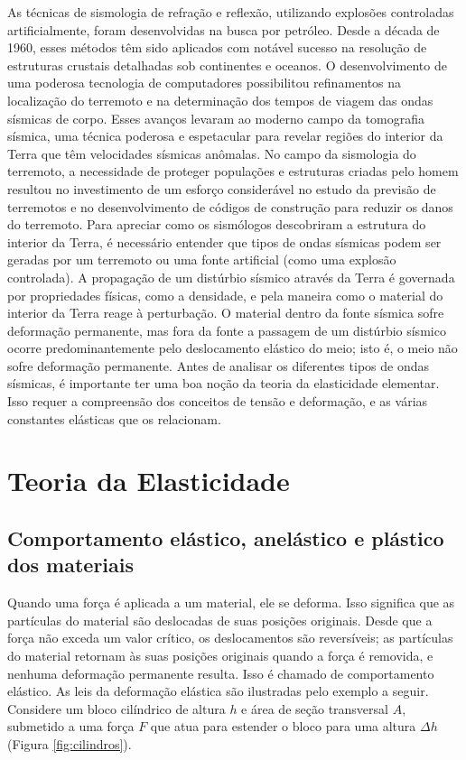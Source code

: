\documentclass[]{book}
\theoremstyle{definition}
\theoremstyle{definition}
\theoremstyle{definition}
\theoremstyle{remark}
\begin{document}
As técnicas de sismologia de refração e reflexão, utilizando explosões controladas artificialmente, foram desenvolvidas na busca por petróleo. Desde a década de 1960, esses métodos têm sido aplicados com notável sucesso na resolução de estruturas crustais detalhadas sob continentes e oceanos. O desenvolvimento de uma poderosa tecnologia de computadores possibilitou refinamentos na localização do terremoto e na determinação dos tempos de viagem das ondas sísmicas de corpo. Esses avanços levaram ao moderno campo da tomografia sísmica, uma técnica poderosa e espetacular para revelar regiões do interior da Terra que têm velocidades sísmicas anômalas. No campo da sismologia do terremoto, a necessidade de proteger populações e estruturas criadas pelo homem resultou no investimento de um esforço considerável no estudo da previsão de terremotos e no desenvolvimento de códigos de construção para reduzir os danos do terremoto.
Para apreciar como os sismólogos descobriram a estrutura do interior da Terra, é necessário entender que tipos de ondas sísmicas podem ser geradas por um terremoto ou uma fonte artificial (como uma explosão controlada). A propagação de um distúrbio sísmico
através da Terra é governada por propriedades físicas, como a densidade, e pela maneira como o material do interior da Terra reage à perturbação. O material dentro da fonte sísmica sofre deformação permanente, mas fora da fonte a passagem de um distúrbio sísmico ocorre predominantemente pelo deslocamento elástico do meio; isto é, o meio não sofre deformação permanente. Antes de analisar os diferentes tipos de ondas sísmicas, é importante ter uma boa noção da teoria da elasticidade elementar. Isso requer a compreensão dos conceitos de tensão e deformação, e as várias constantes elásticas que os relacionam.

\hypertarget{teoria-da-elasticidade}{%
\section{Teoria da Elasticidade}\label{teoria-da-elasticidade}}

\hypertarget{comportamento-elastico-anelastico-e-plastico-dos-materiais}{%
\subsection{Comportamento elástico, anelástico e plástico dos materiais}\label{comportamento-elastico-anelastico-e-plastico-dos-materiais}}

Quando uma força é aplicada a um material, ele se deforma. Isso significa que as partículas do material são deslocadas de suas posições originais. Desde que a força não exceda um valor crítico, os deslocamentos são reversíveis; as partículas do material retornam às suas posições originais quando a força é removida, e nenhuma deformação permanente resulta. Isso é chamado de comportamento elástico. As leis da deformação elástica são ilustradas pelo exemplo a seguir. Considere um bloco cilíndrico de altura \(h\) e área de seção transversal \(A\), submetido a uma força \(F\) que atua para estender o bloco para uma altura \(\Delta h\) (Figura \ref{fig:cilindros}).
\end{document}
